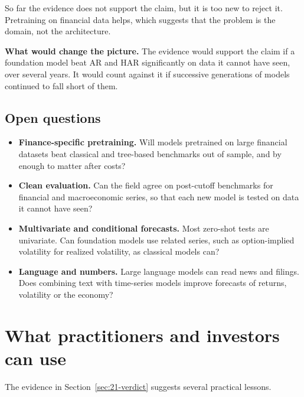 So far the evidence does not support the claim, but it is too new to reject it. Pretraining on financial data helps, which suggests that the problem is the domain, not the architecture.

\textbf{What would change the picture.} The evidence would support the claim if a foundation model beat AR and HAR significantly on data it cannot have seen, over several years. It would count against it if successive generations of models continued to fall short of them.

\subsection{Open questions}
\label{sec:21-open}

\begin{itemize}
  \item \textbf{Finance-specific pretraining.} Will models pretrained on large financial datasets beat classical and tree-based benchmarks out of sample, and by enough to matter after costs?
  \item \textbf{Clean evaluation.} Can the field agree on post-cutoff benchmarks for financial and macroeconomic series, so that each new model is tested on data it cannot have seen?
  \item \textbf{Multivariate and conditional forecasts.} Most zero-shot tests are univariate. Can foundation models use related series, such as option-implied volatility for realized volatility, as classical models can?
  \item \textbf{Language and numbers.} Large language models can read news and filings. Does combining text with time-series models improve forecasts of returns, volatility or the economy?
\end{itemize}

\section{What practitioners and investors can use}
\label{sec:21-investors}

The evidence in Section~\ref{sec:21-verdict} suggests several practical lessons.

